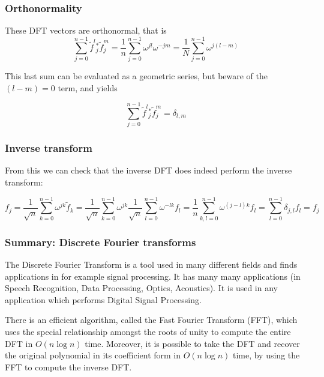 \documentclass{beamer}
\begin{document}
\begin{frame}
\frametitle{Orthonormality}

These DFT vectors are orthonormal, that is
\begin{equation*}
\sum_{j=0}^{n-1} \tilde{f}^{l}{ }_{j}^{*} \tilde{f}_{j}^{m}=\frac{1}{n} \sum_{j=0}^{n-1} \omega^{j l} \omega^{-j m}=\frac{1}{N} \sum_{j=0}^{n-1} \omega^{j(l-m)} 
\end{equation*}

This last sum can be evaluated as a geometric series, but beware of the $(l-m)=0$ term, and yields

\begin{equation*}
\sum_{j=0}^{n-1} \tilde{f}^{l}{ }_{j}^{*} \tilde{f}_{j}^{m}=\delta_{l, m}
\end{equation*}
\end{frame}

\begin{frame}
\frametitle{Inverse transform}

From this we can check that the inverse DFT does indeed perform the inverse transform:

\begin{equation*}
f_{j}=\frac{1}{\sqrt{n}} \sum_{k=0}^{n-1} \omega^{j k} \tilde{f}_{k}=\frac{1}{\sqrt{n}} \sum_{k=0}^{n-1} \omega^{j k} \frac{1}{\sqrt{n}} \sum_{l=0}^{n-1} \omega^{-l k} f_{l}=\frac{1}{n} \sum_{k, l=0}^{n-1} \omega^{(j-l) k} f_{l}=\sum_{l=0}^{n-1} \delta_{j, l} f_{l}=f_{j} 
\end{equation*}
\end{frame}

\begin{frame}
\frametitle{Summary: Discrete Fourier transforms}

The Discrete Fourier Transform is a tool used in many different fields
and finds applications in for example signal processing.  It has many
many applications (in Speech Recognition, Data Processing, Optics,
Acoustics). It is used in any application which performs Digital
Signal Processing.

There
is an efficient algorithm, called the Fast Fourier Transform (FFT),
which uses the special relationship amongst the roots of unity to
compute the entire DFT in $O(n \log{n})$ time. Moreover, it is possible to take the DFT and recover the original
polynomial in its coefficient form in $O(n \log{n})$ time, by using the
FFT to compute the inverse DFT.
\end{frame}
\end{document}
